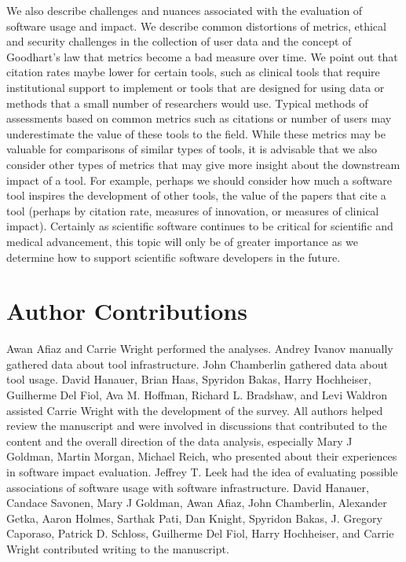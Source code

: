 \documentclass{article}
\begin{document}
We also describe challenges and nuances associated with the evaluation of software usage and impact. We describe common distortions of metrics, ethical and security challenges in the collection of user data and the concept of Goodhart's law that metrics become a bad measure over time. We point out that citation rates maybe lower for certain tools, such as clinical tools that require institutional support to implement or tools that are designed for using data or methods that a small number of researchers would use. Typical methods of assessments based on common metrics such as citations or number of users may underestimate the value of these tools to the field. While these metrics may be valuable for comparisons of similar types of tools, it is advisable that we also consider other types of metrics that may give more insight about the downstream impact of a tool. For example, perhaps we should consider how much a software tool inspires the development of other tools, the value of the papers that cite a tool (perhaps by citation rate, measures of innovation, or measures of clinical impact). Certainly as scientific software continues to be critical for scientific and medical advancement, this topic will only be of greater importance as we determine how to support scientific software developers in the future. 
 
 
\section{Author Contributions}


Awan Afiaz and Carrie Wright performed the analyses. Andrey Ivanov manually gathered data about tool infrastructure. John Chamberlin gathered data about tool usage. David Hanauer, Brian Haas, Spyridon Bakas, Harry Hochheiser, Guilherme Del Fiol, Ava M. Hoffman, Richard L. Bradshaw, and Levi Waldron assisted Carrie Wright with the development of the survey.  All authors helped review the manuscript and were involved in discussions that contributed to the content and the overall direction of the data analysis, especially Mary J Goldman, Martin Morgan, Michael Reich, who presented about their experiences in software impact evaluation. Jeffrey T. Leek had the idea of evaluating possible associations of software usage with software infrastructure. David Hanauer, Candace Savonen, Mary J Goldman, Awan Afiaz, John Chamberlin, Alexander Getka, Aaron Holmes, Sarthak Pati, Dan Knight,  Spyridon Bakas, J. Gregory Caporaso, Patrick D. Schloss, Guilherme Del Fiol, Harry Hochheiser, and Carrie Wright contributed writing to the manuscript. 
\end{document}
